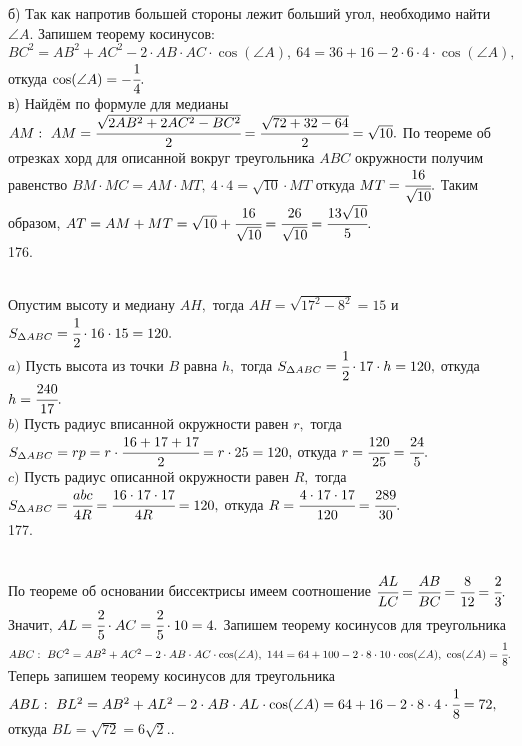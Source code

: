 б) Так как напротив большей стороны лежит больший угол, необходимо найти $\angle A.$ Запишем теорему косинусов: $BC^2=AB^2+AC^2-2\cdot AB\cdot AC\cdot \cos(\angle A),\ 64=36+16-2\cdot6\cdot4\cdot \cos(\angle A),$ откуда $\cos(\angle A)=-\cfrac{1}{4}.$\\
в) Найдём по формуле для медианы $AM:\ AM=\cfrac{\sqrt{2AB^2+2AC^2-BC^2}}{2}=\cfrac{\sqrt{72+32-64}}{2}=\sqrt{10}.$ По теореме об отрезках хорд для описанной вокруг треугольника $ABC$ окружности получим равенство $BM\cdot MC= AM\cdot MT,\ 4\cdot4=\sqrt{10}\cdot MT$ откуда $MT=\cfrac{16}{\sqrt{10}}.$ Таким образом,
$AT=AM+MT=\sqrt{10}+\cfrac{16}{\sqrt{10}}=\cfrac{26}{\sqrt{10}}=\cfrac{13\sqrt{10}}{5}.$\\
176. \begin{figure}[ht!]
\end{figure}\\
Опустим высоту и медиану $AH,$ тогда $AH=\sqrt{17^2-8^2}=15$ и $S_{\Delta ABC}=\cfrac{1}{2}\cdot16\cdot15=120.$\\
$a)$ Пусть высота из точки $B$ равна $h,$ тогда $S_{\Delta ABC}=\cfrac{1}{2}\cdot17\cdot h=120,$ откуда $h=\cfrac{240}{17}.$\\
$b)$ Пусть радиус вписанной окружности равен $r,$ тогда $S_{\Delta ABC}=rp=r\cdot\cfrac{16+17+17}{2}=r\cdot25=120,$ откуда $r=\cfrac{120}{25}=\cfrac{24}{5}.$\\
$c)$ Пусть радиус описанной окружности равен $R,$ тогда $S_{\Delta ABC}=\cfrac{abc}{4R}=\cfrac{16\cdot17\cdot17}{4R}=120,$ откуда $R=\cfrac{4\cdot17\cdot17}{120}=\cfrac{289}{30}.$\\
177. \begin{figure}[ht!]
\end{figure}\\
По теореме об основании биссектрисы имеем соотношение $\cfrac{AL}{LC}=\cfrac{AB}{BC}=\cfrac{8}{12}=\cfrac{2}{3}.$ Значит, $AL=\cfrac{2}{5}\cdot AC=\cfrac{2}{5}\cdot10=4.$ Запишем теорему косинусов для треугольника $ABC:\ BC^2=AB^2+AC^2-2\cdot AB\cdot AC\cdot \cos(\angle A),\ 144=64+100-2\cdot8\cdot10\cdot
\cos(\angle A),\ \cos(\angle A)=\cfrac{1}{8}.$ Теперь запишем теорему косинусов для треугольника $ABL:\ BL^2=AB^2+AL^2-2\cdot AB\cdot AL\cdot \cos(\angle A)=
64+16-2\cdot8\cdot4\cdot\cfrac{1}{8}=72,$ откуда $BL=\sqrt{72}=6\sqrt{2}.$\newpage{}. \begin{figure}[ht!]
\end{figure}\\
